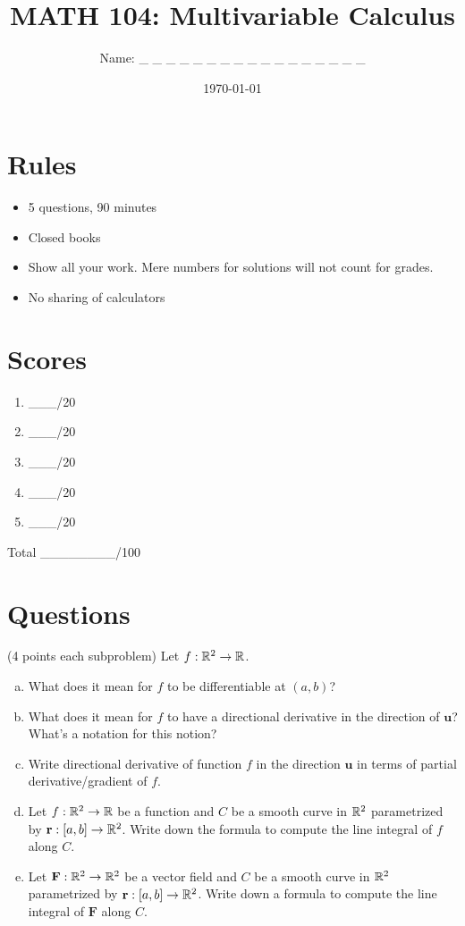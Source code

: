 \documentclass[12pt]{article}
\title{ MATH 104: Multivariable Calculus}
\author{Name: \_ \_ \_ \_ \_ \_ \_ \_ \_ \_ \_ \_ \_ \_ \_ \_ \_}
\date{\today}
\newcommand{\vect}{\mathbf}
\begin{document}
\maketitle

\section*{Rules}

\begin{itemize}
    \item 5 questions, 90 minutes
    \item Closed books
    \item Show all your work. Mere numbers for solutions will not count for grades.
    \item No sharing of calculators
\end{itemize}

\section*{Scores}

\begin{enumerate}[Problem 1.]
    \item  \_\_\_/20
    \item  \_\_\_/20
    \item \_\_\_/20
    \item  \_\_\_/20
    \item  \_\_\_/20
\end{enumerate}
Total \_\_\_\_\_\_\_\_/100


\newpage
\section*{Questions}

\begin{problem}
    (4 points each subproblem)
    Let $f:\mathbb{R}^2 \to \mathbb{R}$.
    \begin{enumerate}[(a)]
        \item  What does it mean for $f$ to be 
            differentiable at $(a,b)$?
        \item What does it mean for $f$ to have a directional derivative
            in the direction of $\textbf{u}$? What's a notation for this notion?
        \item Write directional derivative of function $f$ in the direction $\textbf{u}$ in terms of partial derivative/gradient of $f$.
        \item Let $f:\mathbb{R}^2 \to \mathbb{R}$ be a function and $C$ be a smooth curve in $\mathbb{R}^2$ parametrized by $\vect{r}:[a,b]\to \R^2$. Write down the formula to compute the line integral of $f$ along $C$.
        \item Let $\vect{F}:\R^2 \to \R^2$ be a vector field and $C$ be a smooth curve in $\mathbb{R}^2$ parametrized by $\vect{r}:[a,b]\to \R^2$. Write down a formula to compute the line integral of $\vect{F}$ along $C$.
    \end{enumerate}
\end{problem}
\end{document}
